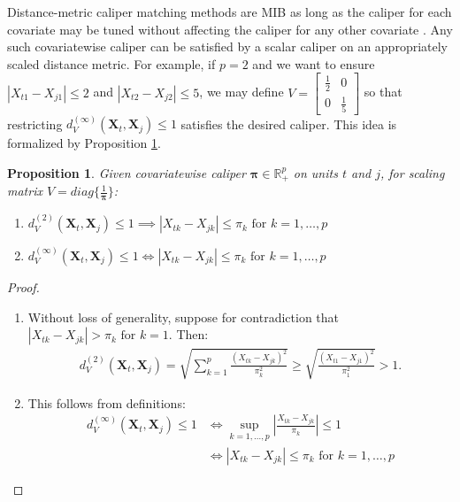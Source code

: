 \documentclass{article}
\newtheorem{proposition}[theorem]{Proposition}
\newcommand{\Xt}{\mathbf{X}_t}
\newcommand{\Xj}{\mathbf{X}_j}
\begin{document}
Distance-metric caliper matching methods are MIB as long as the caliper for each covariate may be tuned without affecting the caliper for any other covariate \citep{iacus2011multivariate}.
Any such covariatewise caliper can be satisfied by a scalar caliper on an appropriately scaled distance metric.
For example, if $p=2$ and we want to ensure $|X_{t1} - X_{j1}| \leq 2$ and $|X_{t2} - X_{j2}| \leq 5$, we may define $V = \begin{bmatrix} \frac{1}{2} & 0 \\ 0 & \frac{1}{5} \end{bmatrix}$ so that restricting $d^{(\infty)}_V(\Xt, \Xj) \leq 1$ satisfies the desired caliper.
This idea is formalized by Proposition \ref{prop:distmetriccal}.
\begin{proposition}
\label{prop:distmetriccal}
    Given covariatewise caliper $\boldsymbol{\pi} \in \mathbb{R}^p_{+}$ on units $t$ and $j$, for scaling matrix $V = diag\{\frac{1}{\boldsymbol{\pi}}\}$:
    \begin{enumerate}[label=(\alph*)]
        \item $d^{(2)}_V(\Xt, \Xj) \leq 1 \implies |X_{tk}-X_{jk}| \leq \pi_k \text{ for } k=1,\dots,p $
        \label{prop:dmca}
        \item $ d^{(\infty)}_V(\Xt, \Xj) \leq 1 \iff |X_{tk}-X_{jk}| \leq \pi_k \text{ for } k=1,\dots,p $
        \label{prop:dmcb}
    \end{enumerate}
\end{proposition}
\begin{proof}
    \begin{enumerate}[label=(\alph*)]
        \item Without loss of generality, suppose for contradiction that $|X_{tk}-X_{jk}| > \pi_k \text{ for } k=1$. 
        Then:
        \begin{align*}
            d^{(2)}_V(\Xt,\Xj) 
            = \sqrt{\sum_{k=1}^p \frac{(X_{tk}-X_{jk})^2}{\pi_k^2}}
            \geq \sqrt{\frac{(X_{t1}-X_{j1})^2}{\pi_1^2}}
            > 1.
        \end{align*}
        \item This follows from definitions:
        \begin{align*}
            d^{(\infty)}_V(\Xt, \Xj) \leq 1
            &\iff \sup_{k = 1, \dots, p} |\frac{X_{tk} - X_{jk}}{\pi_k}| \leq 1 \\
            &\iff |X_{tk}-X_{jk}| \leq \pi_k \text{ for } k=1,\dots,p 
        \end{align*}
    \end{enumerate}
\end{proof}
\end{document}
